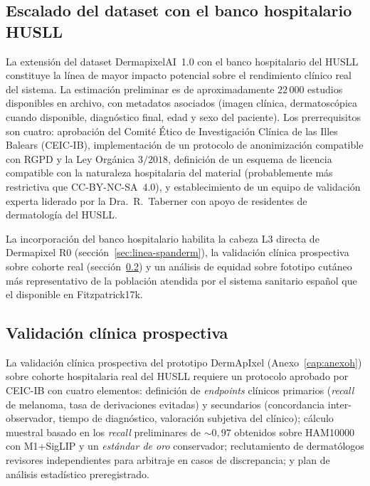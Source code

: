 \subsection{Escalado del dataset con el banco hospitalario HUSLL}
\label{sec:linea-husll}

La extensión del dataset DermapixelAI~1.0 con el banco hospitalario
del HUSLL constituye la línea de mayor impacto potencial sobre el
rendimiento clínico real del sistema. La estimación preliminar es
de aproximadamente $22\,000$ estudios disponibles en archivo,
con metadatos asociados (imagen clínica, dermatoscópica cuando
disponible, diagnóstico final, edad y sexo del paciente). Los
prerrequisitos son cuatro: aprobación del Comité Ético de
Investigación Clínica de las Illes Balears (CEIC-IB),
implementación de un protocolo de anonimización compatible con
RGPD y la Ley Orgánica $3/2018$, definición de un esquema de
licencia compatible con la naturaleza hospitalaria del material
(probablemente más restrictiva que CC-BY-NC-SA~4.0), y
establecimiento de un equipo de validación experta liderado por la
Dra.~R.~Taberner con apoyo de residentes de dermatología del HUSLL.

La incorporación del banco hospitalario habilita la cabeza L3 directa de Dermapixel R0
(sección~\ref{sec:linea-spanderm}), la validación clínica prospectiva
sobre cohorte real (sección~\ref{sec:linea-prospectivo}) y un análisis
de equidad sobre fototipo cutáneo más representativo de la
población atendida por el sistema sanitario español que el
disponible en Fitzpatrick17k.

\subsection{Validación clínica prospectiva}
\label{sec:linea-prospectivo}

La validación clínica prospectiva del prototipo DermApIxel
(Anexo~\ref{cap:anexoh}) sobre cohorte hospitalaria real
del HUSLL requiere un protocolo aprobado por CEIC-IB con cuatro
elementos: definición de \emph{endpoints} clínicos primarios
(\emph{recall} de melanoma, tasa de derivaciones evitadas) y
secundarios (concordancia inter-observador, tiempo de
diagnóstico, valoración subjetiva del clínico); cálculo
muestral basado en los \emph{recall} preliminares de
$\sim 0{,}97$ obtenidos sobre HAM10000 con M1+SigLIP y un
\emph{estándar de oro} conservador; reclutamiento de dermatólogos
revisores independientes para arbitraje en casos de discrepancia;
y plan de análisis estadístico preregistrado.


